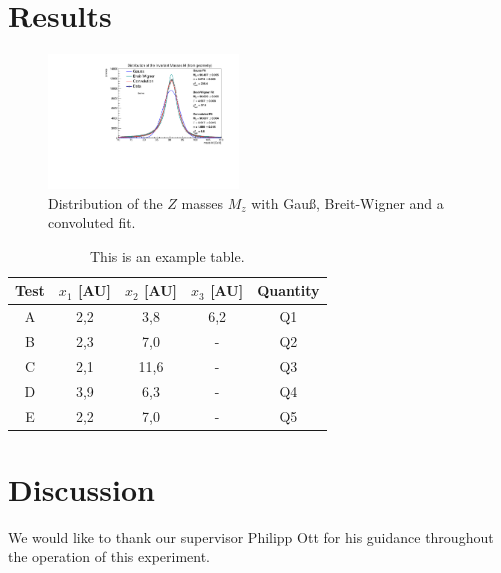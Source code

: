 \documentclass[twocolumn,
			   showpacs,%
               nofootinbib,
               aps,%
               prd,
               notitlepage,
               showkeys,
               10pt]{revtex4-1}
\begin{document}
\section{Results}
\blindtext


\begin{figure}[H]
	\centering
	\includegraphics[width = 0.45\textwidth]{figures/plots/ZMassFitted}
	\caption{Distribution of the $Z$ masses $M_z$ with Gau\ss, Breit-Wigner and a convoluted fit.}
\end{figure}

\begin{table}[!htbp]
\centering
\setlength{\tabcolsep}{2mm}
\renewcommand{\arraystretch}{1.5}
\begin{tabular}{|c||c|c|c|c|}
\hline
Test & $x_1$ [AU] & $x_2$ [AU] & $x_3$ [AU] & Quantity \\ \hline \hline
A & 2,2 & 3,8 & 6,2 & Q1 \\
\hline
B & 2,3 & 7,0 & - & Q2 \\
\hline
C & 2,1 & 11,6 & - & Q3 \\
\hline
D & 3,9 & 6,3 & - & Q4\\
\hline
E & 2,2 & 7,0 & - & Q5 \\
\hline
\end{tabular}
\caption{\label{tab:test}This is an example table.}
\end{table}




\section{Discussion}

\Blindtext


\begin{acknowledgments}

We would like to thank our supervisor Philipp Ott for his guidance throughout the operation of this experiment.

\end{acknowledgments}



\nocite{*}
\end{document}
